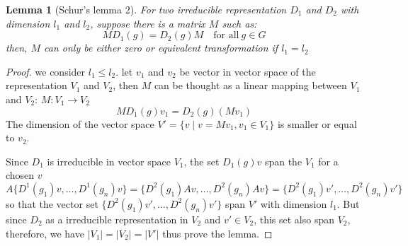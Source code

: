 \documentclass{amsart}
\newtheorem*{lemma}{Lemma}
\theoremstyle{remark}
\theoremstyle{remark}
\theoremstyle{definition}
\begin{document}
\vspace{10pt}

\begin{lemma}
    [Schur's lemma 2]
    For two irreducible representation $D_1$ and $D_2$ with dimension $l_1$ and $l_2$,
    suppose there is a matrix $M$ such as:
    \begin{equation*}
        MD_1(g) = D_2(g)M\quad \text{for all}\ g \in G
    \end{equation*}
    then, $M$ can only be either zero or equivalent transformation if $l_1 = l_2$
\end{lemma}
\begin{proof}
we consider $l_1 \leq l_2$. let $v_1$ and $v_2$ be vector in vector space of the representation $V_1$ and $V_2$,
then $M$ can be thought as a linear mapping between $V_1$ and $V_2$: $M\colon V_1 \to V_2$
\begin{equation*}
    MD_1(g)v_1 = D_2(g)(Mv_1)
\end{equation*}
The dimension of the vector space $V' = \{v\mid v = Mv_1, v_1\in V_1 \}$ is smaller or equal to $v_2$. 

Since $D_1$ is irreducible in vector space $V_1$, the set $D_1(g)v$ span the $V_1$ for a chosen $v$
\begin{equation*}
    A\{D^1(g_1)v,\dots, D^1(g_n)v\} = \{D^2(g_1)Av,\dots, D^2(g_n)Av\}
    = \{D^2(g_1)v',\dots, D^2(g_n)v'\}
\end{equation*}
so that the vector set $\{D^2(g_1)v',\dots, D^2(g_n)v'\}$ span $V'$ with dimension $l_1$. 
But since $D_2$ as a irreducible
representation in $V_2$ and $v'\in V_2$, this set also span $V_2$, 
therefore, we have $|V_1|=|V_2|=|V'|$ thus prove the lemma.
\end{proof}
\end{document}
